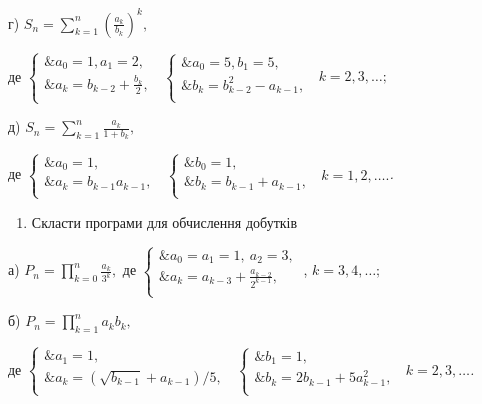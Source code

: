 \documentclass[]{article}
\begin{document}
г) \(S_{n} = \sum_{k = 1}^{n}\left( \frac{a_{k}}{b_{k}} \right)^{k},\)

де \(\left\{ \begin{matrix}
\& a_{0} = 1,a_{1} = 2, \\
\& a_{k} = b_{k - 2} + \frac{b_{k}}{2}, \\
\end{matrix} \right.\ \) \(\left\{ \begin{matrix}
\& a_{0} = 5,b_{1} = 5, \\
\& b_{k} = b_{k - 2}^{2} - a_{k - 1}, \\
\end{matrix} \right.\ \) \(k = 2,3,\ldots;\)

д) \(S_{n} = \sum_{k = 1}^{n}\frac{a_{k}}{1 + b_{k}},\)

де \(\left\{ \begin{matrix}
\& a_{0} = 1, \\
\& a_{k} = b_{k - 1}a_{k - 1}, \\
\end{matrix} \right.\ \) \(\left\{ \begin{matrix}
\& b_{0} = 1, \\
\& b_{k} = b_{k - 1} + a_{k - 1}, \\
\end{matrix} \right.\ \) \(k = 1,2,\ldots.\)\emph{.}

\begin{enumerate}
\def\labelenumi{\arabic{enumi})}
\item
  Скласти програми для обчислення добутків
\end{enumerate}

а) \(P_{n} = \prod_{k = 0}^{n}{\frac{a_{k}}{3^{k}},}\) де
\(\left\{ \begin{matrix}
\& a_{0} = a_{1} = 1,\ a_{2} = 3, \\
\& a_{k} = a_{k - 3} + \frac{a_{k - 2}}{2^{k - 1}}, \\
\end{matrix} \right.\ \), \(k = 3,4,\ldots;\)

б) \(P_{n} = \prod_{k = 1}^{n}{a_{k}b_{k},}\)

де \(\left\{ \begin{matrix}
\& a_{1} = 1, \\
\& a_{k} = \left( \sqrt{b_{k - 1}} + a_{k - 1} \right)/5, \\
\end{matrix} \right.\ \) \(\left\{ \begin{matrix}
\& b_{1} = 1, \\
\& b_{k} = 2b_{k - 1} + 5a_{k - 1}^{2}, \\
\end{matrix} \right.\ \) \(k = 2,3,\ldots\)\emph{.}
\end{document}
